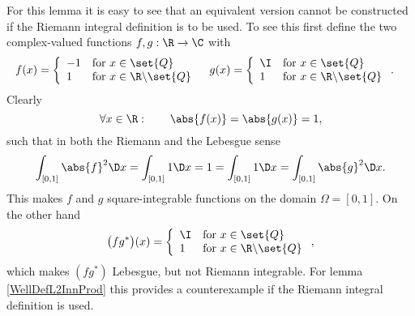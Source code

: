 \begin{rem} For this lemma it is easy to see that an equivalent version cannot be constructed if the Riemann integral definition is to be used. 
	To see this first define the two complex-valued functions $f,g : \R \to \C$ with
	\begin{align*}
		f(x) &= \left\{
		\begin{array}{ll}
			-1 & \text{for $x \in \set{Q}$} \\
			1 & \text{for $x \in \R \backslash \set{Q}$}
		\end{array}
		\right.
		&
		g(x) &= \left\{
		\begin{array}{ll}
			\I & \text{for $x \in \set{Q}$} \\
			1 & \text{for $x \in \R \backslash \set{Q}$}
		\end{array}
		\right. .
	\end{align*}
	Clearly 
	\[ \forall x \in \R:\qquad \abs{f(x)} = \abs{g(x)} = 1,\]
	such that in both the Riemann and the Lebesgue sense
	\[ \int_{[0,1]} \abs{f}^2 \D x = \int_{[0,1]} 1 \D x = 1 = \int_{[0,1]} 1 \D x = \int_{[0,1]} \abs{g}^2 \D x.\]
	This makes $f$ and $g$ square-integrable functions on the domain $\Omega = [0,1]$. 
	On the other hand 
	\[ \big(f g^\ast\big)(x) = \left\{
		\begin{array}{ll}
			\I & \text{for $x \in \set{Q}$} \\
			1 & \text{for $x \in \R \backslash \set{Q}$}
		\end{array}
		\right., \]
	which makes $(f g^\ast)$ Lebesgue, but not Riemann integrable. 
	For lemma \ref{WellDefL2InnProd} this provides a counterexample if the Riemann integral definition is used.
\end{rem}

